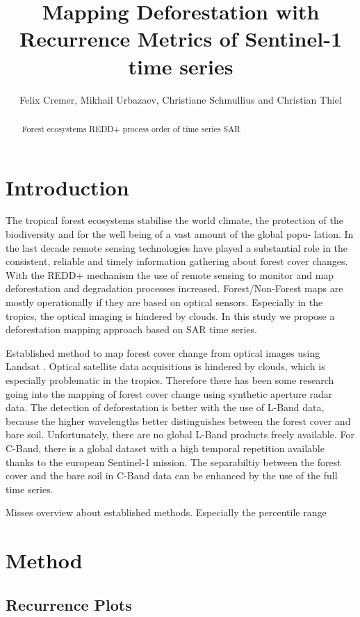 \documentclass{article}
\title{Mapping Deforestation with Recurrence Metrics of Sentinel-1 time series}
\author{Felix Cremer, Mikhail Urbazaev, Christiane Schmullius and Christian Thiel}
\begin{document}
\maketitle
\begin{abstract}
  Forest ecosystems
  REDD+ process
  order of time series
  SAR

%
\end{abstract}
\section{Introduction}
The tropical forest ecosystems stabilise the world climate\cite{}, the protection of the biodiversity \cite{} and
for the well being of a vast amount of the global popu-
lation\cite{}.
 In the last decade remote sensing technologies have
played a substantial role in the consistent, reliable and timely
information gathering about forest cover changes. With the
REDD+ mechanism the use of remote sensing to monitor
and map deforestation and degradation processes increased.
Forest/Non-Forest maps are mostly operationally if
they are based on optical sensors. Especially in the tropics,
the optical imaging is hindered by clouds. In this study we
 propose a deforestation mapping approach based on SAR time
series.

Established method to map forest cover change from optical images using Landsat \cite{Hansen}.
Optical satellite data acquisitions is hindered by clouds, which is especially problematic in the tropics.
Therefore there has been some research going into the mapping of forest cover change using synthetic aperture radar data.
The detection of deforestation is better with the use of L-Band data, because the higher wavelengths better distinguishes between the forest cover and bare soil.
Unfortunately, there are no global L-Band products freely available.
For C-Band, there is a global dataset with a high temporal repetition available thanks to the european Sentinel-1 mission.
The separabiltiy between the forest cover and the bare soil in C-Band data can be enhanced by the use of the full time series.


Misses overview about established methods.
Especially the percentile range

\section{Method}

\subsection{Recurrence Plots}
\end{document}
